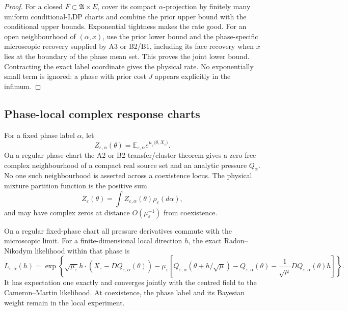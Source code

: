 \begin{proof}
For a closed $F\subset\mathfrak A\times E$, cover its compact
$\alpha$-projection by finitely many uniform conditional-LDP charts and combine
the prior upper bound with the conditional upper bounds.  Exponential
tightness makes the rate good.  For an open neighbourhood of $(\alpha,x)$,
use the prior lower bound and the phase-specific microscopic recovery supplied
by A3 or B2/B1, including its face recovery when $x$ lies at the boundary of
the phase mean set.  This proves the joint lower bound.  Contracting the exact
label coordinate gives the physical rate.  No exponentially small term is
ignored: a phase with prior cost $J$ appears explicitly in the infimum.
\end{proof}

\subsection{Phase-local complex response charts}

For a fixed phase label $\alpha$, let
\[
 Z_{\varepsilon,\alpha}(\theta)
 =\mathbb E_{\varepsilon,\alpha}
 e^{\mu_\varepsilon\langle\theta,X_\varepsilon\rangle}.
\]
On a regular phase chart the A2 or B2 transfer/cluster theorem gives a
zero-free complex neighbourhood of a compact real source set and an analytic
pressure $Q_\alpha$.  No one such neighbourhood is asserted across a
coexistence locus.  The physical mixture partition function is the positive
sum
\[
 Z_\varepsilon(\theta)
 =\int Z_{\varepsilon,\alpha}(\theta)\rho_\varepsilon(d\alpha),
\]
and may have complex zeros at distance $O(\mu_\varepsilon^{-1})$ from
coexistence.

\begin{theorem}
\label{thm:r9-d1-likelihood}
On a regular fixed-phase chart all pressure derivatives commute with the
microscopic limit.  For a finite-dimensional local direction $h$, the exact
Radon--Nikodym likelihood within that phase is
\[
 L_{\varepsilon,\alpha}(h)
 =\exp\left\{
 \sqrt{\mu_\varepsilon}
 h\cdot(X_\varepsilon-DQ_{\varepsilon,\alpha}(\theta))
 -\mu_\varepsilon\left[
 Q_{\varepsilon,\alpha}(\theta+h/\sqrt\mu)
 -Q_{\varepsilon,\alpha}(\theta)
 -\frac1{\sqrt\mu}DQ_{\varepsilon,\alpha}(\theta)h
 \right]
 \right\}.
\]
It has expectation one exactly and converges jointly with the centred field to
the Cameron--Martin likelihood.  At coexistence, the phase label and its
Bayesian weight remain in the local experiment.
\end{theorem}

